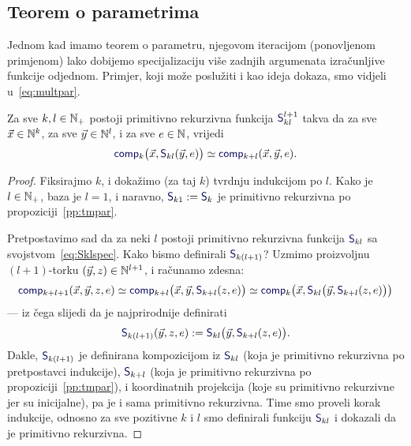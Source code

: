 \subsection{Teorem o parametrima}

Jednom kad imamo teorem o parametru, njegovom iteracijom (ponovljenom primjenom) lako dobijemo specijalizaciju više zadnjih argumenata izračunljive funkcije odjednom. Primjer, koji može poslužiti i kao ideja dokaza, smo vidjeli u~\eqref{eq:multpar}.

\begin{korolar}\label{kor:pars}
Za sve $k,l\in{\mathbb N}_+$ postoji primitivno rekurzivna funkcija $\f S_{kl}^{l+1}$ takva da za sve $\vec x\in{\mathbb N}^k$, za sve $\vec y\in{\mathbb N}^l$, i za sve $e\in{\mathbb N}$, vrijedi
\begin{equation}\label{eq:Sklspec}
    \f{comp}_k\bigl(\vec x,\f S_{kl}(\vec y,e)\bigr)\simeq\f{comp}_{k+l}(\vec x,\vec y,e)\text.
\end{equation}
\end{korolar}
\begin{proof}
Fiksirajmo $k$, i dokažimo (za taj $k$) tvrdnju indukcijom po $l$. Kako je $l\in{\mathbb N}_+$, baza je $l=1$, i naravno, $\f S_{k1}:=\f S_k$ je primitivno rekurzivna po propoziciji~\ref{pp:tmpar}.

Pretpostavimo sad da za neki $l$ postoji primitivno rekurzivna funkcija $\f S_{kl}$ sa svojstvom~\eqref{eq:Sklspec}. Kako bismo definirali $\f S_{k(l+1)}$? Uzmimo proizvoljnu $(l+1)$-torku $(\vec y,z)\in{\mathbb N}^{l+1}$, i računamo zdesna:
\begin{equation}
    \f{comp}_{k+l+1}(\vec x,\vec y,z,e)\simeq
    \f{comp}_{k+l}\bigl(\vec x,\vec y,\f S_{k+l}(z,e)\bigr)\simeq
    \f{comp}_k\bigl(\vec x,\f S_{kl}\bigl(
    \vec y,\f S_{k+l}(z,e)
    \bigr)\bigr)
\end{equation}
--- iz čega slijedi da je najprirodnije definirati
\begin{equation}
    \f S_{k(l+1)}(\vec y,z,e):=\f S_{kl}\bigl(\vec y,\f S_{k+l}(z,e)\bigr)\text.
\end{equation}
Dakle, $\f S_{k(l+1)}$ je definirana kompozicijom iz $\f S_{kl}$ (koja je primitivno rekurzivna po pretpostavci indukcije), $\f S_{k+l}$ (koja je primitivno rekurzivna po propoziciji~\ref{pp:tmpar}), i koordinatnih projekcija (koje su primitivno rekurzivne jer su inicijalne), pa je i sama primitivno rekurzivna. Time smo proveli korak indukcije, odnosno za sve pozitivne $k$ i $l$ smo definirali funkciju $\f S_{kl}$ i dokazali da je primitivno rekurzivna.
\end{proof}

